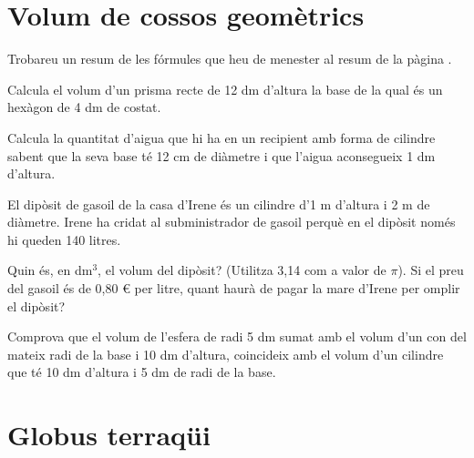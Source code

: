 \section{Volum de cossos geomètrics}

\begin{theorybox}
	Trobareu un resum de les fórmules que heu de menester al resum de la pàgina \pageref{sec:resumvolums}.
\end{theorybox}

\begin{mylist}
\exer Calcula el volum d'un prisma recte de 12 dm d'altura la base de la qual és un hexàgon de 4 dm de costat.

\exer  Calcula la quantitat d'aigua que hi ha en un recipient amb forma de cilindre sabent que la seva base té 12 cm de diàmetre i que l'aigua aconsegueix 1 dm d'altura. 

\exer[1]  El dipòsit de gasoil de la casa d'Irene és un cilindre d'1 m d'altura i 2 m de diàmetre. Irene ha cridat al subministrador de gasoil perquè en el dipòsit només hi queden 140 litres.

\begin{tasks}
   \task Quin és, en dm${}^{3}$, el volum del dipòsit? (Utilitza 3,14 com a valor de $\pi$).
   \task Si el preu del gasoil és de 0,80 \euro{} per litre, quant haurà de pagar la mare d'Irene per omplir el dipòsit?
\end{tasks}
\answers{[$V=1000\pi=3140$ dm$^3$=litres, costarà 2400 \euro{}]}

\exer   Comprova que el volum de l'esfera de radi 5 dm sumat amb el volum d'un con del mateix radi de la base i 10 dm d'altura, coincideix amb el volum d'un cilindre que té 10 dm d'altura i 5 dm de radi de la base. 

\end{mylist}
 


\section{Globus terraqüi}


